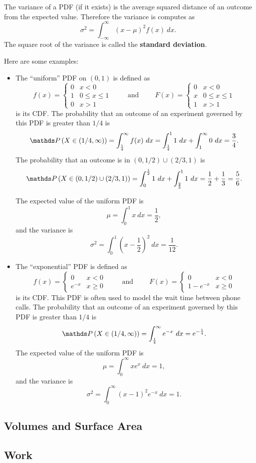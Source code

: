 The variance of a PDF (if it exists) is the average squared distance of an outcome from the expected value. Therefore the variance is computes as
$$\sigma^2 = \int_{-\infty}^\infty (x-\mu)^2f(x)\ dx.$$
The square root of the variance is called the \textbf{standard deviation}.

Here are some examples:
\begin{itemize}
\item The ``uniform'' PDF on $(0,1)$ is defined as
$$f(x)=\begin{cases}0 & x < 0\\ 1 & 0\leq x\leq 1\\ 0 & x>1\end{cases}
\quad\quad\text{ and } \quad\quad
F(x)=\begin{cases}0 & x < 0\\ x & 0\leq x\leq 1\\ 1 & x>1\end{cases}$$
is its CDF. The probability that an outcome of an experiment governed by this PDF is greater than $1/4$ is
$$\P\left(X\in(1/4,\infty)\right)
= \int_{\frac14}^{\infty}f(x)\ dx
= \int_{\frac14}^{1}1\ dx + \int_{1}^{\infty}0\ dx 
= \frac34.
$$
The probability that an outcome is in $(0,1/2)\cup(2/3,1)$ is
$$\P\left(X\in(0,1/2)\cup(2/3,1)\right)
= \int_0^{\frac12}1\ dx + \int_{\frac23}^11\ dx
= \frac12+\frac13 = \frac56.
$$

The expected value of the uniform PDF is
$$\mu=\int_{0}^1 x\ dx=\frac{1}{2},$$
and the variance is
$$\sigma^2 = \int_{0}^1 \left(x-\frac{1}{2}\right)^2\ dx=\frac{1}{12}.$$

\item  The ``exponential'' PDF is defined as
$$f(x)=\begin{cases}0 & x < 0\\ e^{-x} & x\geq 0\end{cases}
\quad\quad\text{ and } \quad\quad
F(x)=\begin{cases}0 & x < 0\\1- e^{-x} & x\geq 0\end{cases}$$
is its CDF. This PDF is often used to model the wait time between phone calls. The probability that an outcome of an experiment governed by this PDF is greater than $1/4$ is
$$\P\left(X\in(1/4,\infty)\right)
= \int_{\frac14}^{\infty} e^{-x}\ dx
= e^{-\frac{1}{4}}.
$$
The expected value of the uniform PDF is
$$\mu=\int_{0}^\infty xe^x\ dx=1,$$
and the variance is
$$\sigma^2 = \int_{0}^\infty \left(x-1\right)^2e^{-x}\ dx=1.$$

\end{itemize}





\subsection{Volumes and Surface Area}


\subsection{Work}
